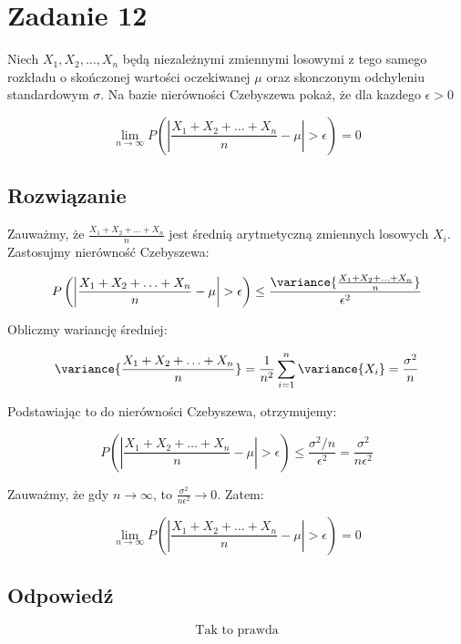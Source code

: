\section{Zadanie 12}
Niech \(X_1, X_2, \ldots, X_n\) będą niezależnymi zmiennymi losowymi z tego samego rozkładu o skończonej wartości oczekiwanej \(\mu\)
oraz skonczonym odchyleniu standardowym \(\sigma\). Na bazie nierówności Czebyszewa pokaż, że dla kazdego \(\epsilon > 0\)

\[\lim_{n \to \infty} P\left(\left|\frac{X_1 + X_2 + \ldots + X_n}{n} - \mu\right| > \epsilon\right) = 0\]

\subsection*{Rozwiązanie}
Zauważmy, że \(\frac{X_1 + X_2 + \ldots + X_n}{n}\) jest średnią arytmetyczną zmiennych losowych \(X_i\). Zastosujmy nierówność Czebyszewa:

\[P\left(\left|\frac{X_1 + X_2 + \ldots + X_n}{n} - \mu\right| > \epsilon\right) \leq \frac{\variance{\frac{X_1 + X_2 + \ldots + X_n}{n}}}{\epsilon^2}\]

Obliczmy wariancję średniej:

\[\variance{\frac{X_1 + X_2 + \ldots + X_n}{n}} = \frac{1}{n^2} \sum_{i=1}^n \variance{X_i} = \frac{\sigma^2}{n}\]

Podstawiając to do nierówności Czebyszewa, otrzymujemy:

\[P\left(\left|\frac{X_1 + X_2 + \ldots + X_n}{n} - \mu\right| > \epsilon\right) \leq \frac{\sigma^2/n}{\epsilon^2} = \frac{\sigma^2}{n\epsilon^2}\]

Zauważmy, że gdy \(n \to \infty\), to \(\frac{\sigma^2}{n\epsilon^2} \to 0\). Zatem:

\[\lim_{n \to \infty} P\left(\left|\frac{X_1 + X_2 + \ldots + X_n}{n} - \mu\right| > \epsilon\right) = 0\]

\subsection*{Odpowiedź}
\[
	\boxed{\text{Tak to prawda}}
\]
